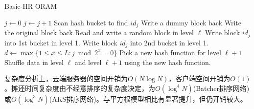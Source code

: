 \begin{algorithm}[H]
    \label{alg:BHR}
    \caption{Basic-HR ORAM}
    \begin{algorithmic}[1]
        \State $j \gets 0$
            \State $j \gets j+1$
                    \State Scan hash bucket to find $id_j$
                        \State Write a dummy block back
                    \Else
                        \State Write the original block back
                    \EndIf
                \Else{}
                    \State Read and write a random block in level $\ell$
                \EndIf
            \EndFor
                \State Write block $id_j$ into 1st bucket in level 1.
            \Else
                \State Write block $id_j$ into 2nd bucket in level 1.
            \EndIf
            \State $d \gets \max\{1\leq x\leq L: j\bmod 2^x = 0\}$
                \State Pick a new hash function for level $\ell+1$
                \State Shuffle data in level $\ell$ and level $\ell+1$ using the new hash function.
            \EndFor
        \EndWhile
    \end{algorithmic}
\end{algorithm}
复杂度分析上，云端服务器的空间开销为$O(N\log N)$，客户端空间开销为$O(1)$。摊还时间复杂度由不经意排序的复杂度决定，为$O(\log^4 N)$(Batcher排序网络)或$O(\log^3 N)$(AKS排序网络)。与平方根模型相比有显著提升，但仍开销较大。

